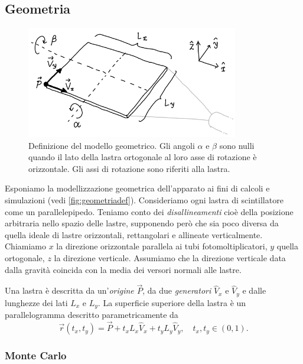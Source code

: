 \subsection{Geometria}
\label{sec:teogeom}

\begin{figure}
	\center
	\includegraphics[width=25em]{geometriadef}
	\caption{\label{fig:geometriadef}
	Definizione del modello geometrico.
	Gli angoli $\alpha$ e $\beta$ sono nulli
	quando il lato della lastra ortogonale al loro asse di rotazione è orizzontale.
	Gli assi di rotazione sono riferiti alla lastra.}
\end{figure}

Esponiamo la modellizzazione geometrica dell'apparato ai fini di calcoli e simulazioni
(vedi \autoref{fig:geometriadef}).
Consideriamo ogni lastra di scintillatore come un parallelepipedo.
Teniamo conto dei \emph{disallineamenti} cioè della posizione arbitraria nello spazio delle lastre,
supponendo però che sia poco diversa da quella ideale di lastre orizzontali, rettangolari e allineate verticalmente.
Chiamiamo $x$ la direzione orizzontale parallela ai tubi fotomoltiplicatori,
$y$ quella ortogonale,
$z$ la direzione verticale.
Assumiamo che la direzione verticale data dalla gravità
coincida con la media dei versori normali alle lastre.

Una lastra è descritta da un'\emph{origine} $\vec P$,
da due \emph{generatori} $\hat V_x$ e $\hat V_y$
e dalle lunghezze dei lati $L_x$ e $L_y$.
La superficie superiore della lastra è un parallelogramma descritto parametricamente da
\begin{equation}
	\label{eq:lastra}
	\vec r(t_x, t_y) = \vec P + t_x L_x \hat V_x + t_y L_y \hat V_y,
	\quad t_x,t_y \in (0,1).
\end{equation}

\subsubsection{Monte Carlo}

